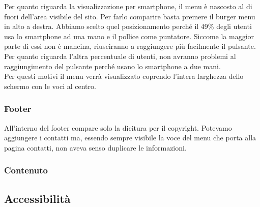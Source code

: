 Per quanto riguarda la visualizzazione per smartphone, il menu è nascosto al di fuori dell'area visibile del sito. Per farlo comparire basta premere il burger menu in alto a destra. Abbiamo scelto quel posizionamento perché il 49\% degli utenti usa lo smartphone ad una mano e il pollice come puntatore. Siccome la maggior parte di essi non è mancina, riusciranno a raggiungere più facilmente il pulsante. Per quanto riguarda l'altra percentuale di utenti, non avranno problemi al raggiungimento del pulsante perché usano lo smartphone a due mani.\\
Per questi motivi il menu verrà visualizzato coprendo l'intera larghezza dello schermo con le voci al centro.

\subsubsection{Footer}
All'interno del footer compare solo la dicitura per il copyright. Potevamo aggiungere i contatti ma, essendo sempre visibile la voce del menu che porta alla pagina contatti, non aveva senso duplicare le informazioni.

\subsubsection{Contenuto}


\subsection{Accessibilità}